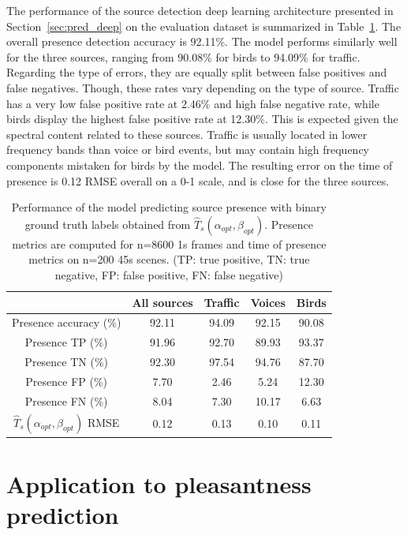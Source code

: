 \documentclass[twocolumn]{article}
\begin{document}
The performance of the source detection deep learning architecture presented in Section~\ref{sec:pred_deep} on the evaluation dataset is summarized in Table~\ref{tab:perf_cmp}. The overall presence detection accuracy is 92.11\%. The model performs similarly well for the three sources, ranging from 90.08\% for birds to 94.09\% for traffic. Regarding the type of errors, they are equally split between false positives and false negatives. Though, these rates vary depending on the type of source. Traffic has a very low false positive rate at 2.46\% and high false negative rate, while birds display the highest false positive rate at 12.30\%. This is expected given the spectral content related to these sources. Traffic is usually located in lower frequency bands than voice or bird events, but may contain high frequency components mistaken for birds by the model. The resulting error on the time of presence is 0.12 RMSE overall on a 0-1 scale, and is close for the three sources.

\begin{table}[h!]
\centering
\caption{Performance of the model predicting source presence with binary ground truth labels obtained from $\hat T_s(\alpha_{opt}, \beta_{opt})$. Presence metrics are computed for n=8600 1s frames and time of presence metrics on n=200 45s scenes. (TP: true positive, TN: true negative, FP: false positive, FN: false negative)}
\label{tab:perf_cmp}
\begin{tabular}{ c | c | c c c }
\hline
	 & All sources & Traffic & Voices & Birds \\ \hline
	Presence accuracy (\%) &  92.11 & 94.09 & 92.15 & 90.08 \\
	Presence TP (\%) & 91.96 & 92.70 & 89.93 & 93.37 \\
	Presence TN (\%) & 92.30 & 97.54 & 94.76 & 87.70 \\
	Presence FP (\%) & 7.70 & 2.46 & 5.24 & 12.30 \\
	Presence FN (\%) & 8.04 & 7.30 & 10.17 & 6.63 \\ \hline
	$\hat T_s(\alpha_{opt}, \beta_{opt})$ RMSE & 0.12 & 0.13 & 0.10 & 0.11 \\
\end{tabular}
\end{table}

\section{Application to pleasantness prediction}
\label{sec:app}
\end{document}

